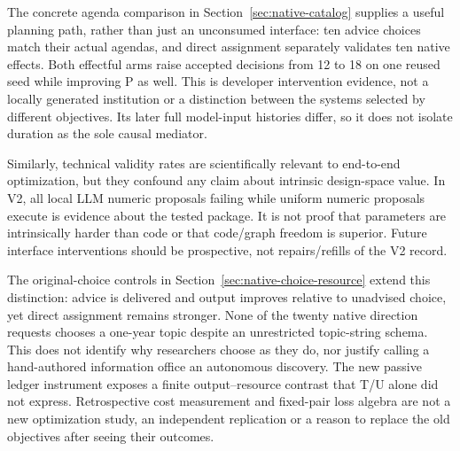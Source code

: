 The concrete agenda comparison in Section~\ref{sec:native-catalog} supplies
a useful planning path, rather than just an unconsumed interface: ten advice
choices match their actual agendas, and direct assignment separately validates
ten native effects. Both effectful arms raise accepted decisions from 12 to 18
on one reused seed while improving P as well. This is developer intervention
evidence, not a locally generated institution or a distinction between the
systems selected by different objectives. Its later full model-input histories
differ, so it does not isolate duration as the sole causal mediator.

Similarly, technical validity rates are scientifically relevant to end-to-end
optimization, but they confound any claim about intrinsic design-space value.
In V2, all local LLM numeric proposals failing while uniform numeric proposals
execute is evidence about the tested package. It is not proof that parameters
are intrinsically harder than code or that code/graph freedom is superior.
Future interface interventions should be prospective, not repairs/refills of
the V2 record.

The original-choice controls in Section~\ref{sec:native-choice-resource} extend
this distinction: advice is delivered and output improves relative to
unadvised choice, yet direct assignment remains stronger. None of the twenty
native direction requests chooses a one-year topic despite an unrestricted
topic-string schema. This does not identify why researchers choose as they do,
nor justify calling a hand-authored information office an autonomous discovery.
The new passive ledger instrument exposes a finite output--resource contrast
that T/U alone did not express. Retrospective cost measurement and fixed-pair
loss algebra are not a new optimization study, an independent replication or
a reason to replace the old objectives after seeing their outcomes.

